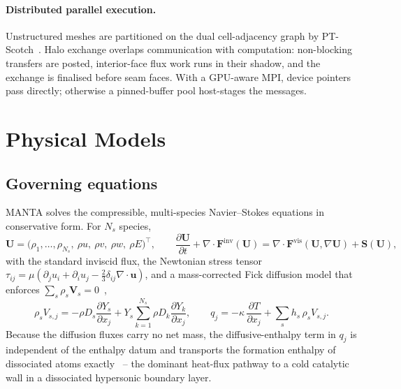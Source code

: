 \documentclass[journal,biblatex]{new-aiaa}
\newcommand{\U}{\mathbf{U}}
\newcommand{\divg}{\nabla\!\cdot\!}
\begin{document}
\paragraph{Distributed parallel execution.}
Unstructured meshes are partitioned on the dual cell-adjacency graph by PT-Scotch~\cite{chevalier_pt-scotch_2008,satanas_scotch_2026}. Halo exchange overlaps communication with computation: non-blocking transfers are posted, interior-face flux work runs in their shadow, and the exchange is finalised before seam faces. With a GPU-aware MPI, device pointers pass directly; otherwise a pinned-buffer pool host-stages the messages.

\section{Physical Models}
\label{sec:models}

\subsection{Governing equations}

MANTA solves the compressible, multi-species Navier--Stokes equations in conservative form. For $N_s$ species,
\begin{equation}
\U = \big(\rho_1,\dots,\rho_{N_s},\ \rho u,\ \rho v,\ \rho w,\ \rho E\big)^{\!\top},
\qquad
\frac{\partial \U}{\partial t} + \divg\mathbf{F}^{\mathrm{inv}}(\U)
= \divg\mathbf{F}^{\mathrm{vis}}(\U,\nabla\U) + \mathbf{S}(\U),
\end{equation}
with the standard inviscid flux, the Newtonian stress tensor
$\tau_{ij}=\mu(\partial_j u_i + \partial_i u_j - \tfrac23\delta_{ij}\divg\mathbf{u})$, and a mass-corrected Fick diffusion model that enforces $\sum_s\rho_s\mathbf{V}_s=0$~\cite{giovangigli_multicomponent_1999},
\begin{equation}
\rho_s V_{s,j} = -\rho D_s \frac{\partial Y_s}{\partial x_j}
 + Y_s \sum_{k=1}^{N_s} \rho D_k \frac{\partial Y_k}{\partial x_j},
\qquad
q_j = -\kappa\,\frac{\partial T}{\partial x_j} + \sum_s h_s\,\rho_s V_{s,j}.
\end{equation}
Because the diffusion fluxes carry no net mass, the diffusive-enthalpy term in $q_j$ is independent of the enthalpy datum and transports the formation enthalpy of dissociated atoms exactly~\cite{gnoffo_conservation_1989} -- the dominant heat-flux pathway to a cold catalytic wall in a dissociated hypersonic boundary layer.
\end{document}
